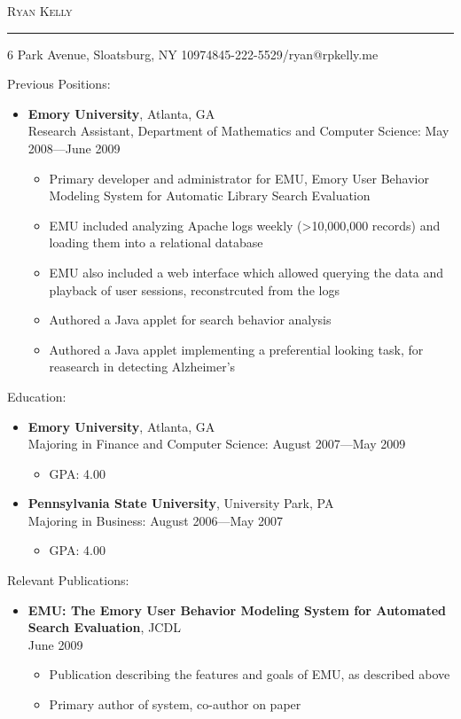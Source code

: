 \documentclass[10pt,oneside]{article}
\makeatletter
\newcommand{\name}{Ryan Kelly}
\newcommand{\addr}{6 Park Avenue, Sloatsburg, NY 10974}
\newcommand{\phone}{845-222-5529}
\newcommand{\email}{ryan@rpkelly.me}
\newcommand{\bigname}[1]{
	\begin{flushleft}\fontfamily{phv}\selectfont\Huge\scshape#1\end{flushleft}
}
\newenvironment{ressection}[1]{
	\vspace{4pt}
	{\fontfamily{phv}\selectfont\Large#1}
	\begin{itemize}
	\vspace{3pt}
}{
	\end{itemize}
}
\newcommand{\ressubitem}[1]{
	\vspace{-1pt}
	\item \begin{flushleft} #1 \end{flushleft}
}
\newcommand{\resbigitem}[3]{
	\vspace{-5pt}
	\item
	\textbf{#1}, #2 \\
	#3
}
\newenvironment{ressubsec}[3]{
	\resbigitem{#1}{#2}{#3}
	\vspace{-2pt}
	\begin{itemize}
}{
	\end{itemize}
}
\makeatother
\begin{document}
 \selectfont

\bigname{\name}

\vspace{-8pt} \rule{\textwidth}{1pt}

\vspace{-1pt} {\small \addr \hfill \phone/\email}

\vspace{8 pt}




\begin{ressection}{Previous Positions:}

	\begin{ressubsec}{Emory University}{Atlanta, GA}{Research Assistant, Department of Mathematics and Computer Science: May 2008---June 2009}
		\ressubitem{Primary developer and administrator for EMU, Emory User Behavior Modeling System for Automatic Library Search Evaluation}
		\ressubitem{EMU included analyzing Apache logs weekly (>10,000,000 records) and loading them into a relational database}
		\ressubitem{EMU also included a web interface which allowed querying the data and playback of user sessions, reconstrcuted from the logs}
		\ressubitem{Authored a Java applet for search behavior analysis}
		\ressubitem{Authored a Java applet implementing a preferential looking task, for reasearch in detecting Alzheimer's }
	\end{ressubsec}

\end{ressection}


\begin{ressection}{Education:}

	\begin{ressubsec}{Emory University}{Atlanta, GA}{Majoring in Finance and Computer Science: August 2007---May 2009}
		\ressubitem{GPA: 4.00}
	\end{ressubsec}

	\begin{ressubsec}{Pennsylvania State University}{University Park, PA}{Majoring in Business: August 2006---May 2007}
		\ressubitem{GPA: 4.00}
	\end{ressubsec}

\end{ressection}

\begin{ressection}{Relevant Publications:}

	\begin{ressubsec}{EMU: The Emory User Behavior Modeling System for Automated Search Evaluation}{JCDL}{June 2009}
		\ressubitem{Publication describing the features and goals of EMU, as described above}
		\ressubitem{Primary author of system, co-author on paper}
	\end{ressubsec}
	
\end{ressection}
\end{document}
